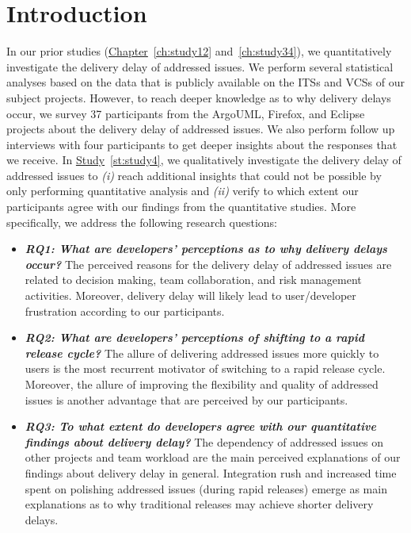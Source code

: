 \section{Introduction} \label{ch6:introduction}

In our prior studies (\hyperref[ch:study12]{Chapter}~\ref{ch:study12}
and~\ref{ch:study34}), we quantitatively investigate the delivery delay of
addressed issues. We perform several statistical analyses based on the data that
is publicly available on the ITSs and VCSs of our subject projects. However, to
reach deeper knowledge as to why delivery delays occur, we survey 37
participants from the ArgoUML, Firefox, and Eclipse projects about the delivery
delay of addressed issues. We also perform follow up interviews with four
participants to get deeper insights about the responses that we receive.  In
\hyperref[st:study4]{Study}~\ref{st:study4}, we qualitatively investigate the
delivery delay of addressed issues to {\em (i)} reach additional insights that
could not be possible by only performing quantitative analysis and {\em (ii)}
verify to which extent our participants agree with our findings from the
quantitative studies. More specifically, we address the following research
questions:

\begin{itemize}

	\item \textbf{\textit{RQ1: What are developers' perceptions as to why
		delivery delays occur?}} The perceived reasons for
		the delivery delay of addressed issues are related to 
		decision making, team collaboration, and risk
		management activities. Moreover, delivery delay will likely lead to
		user/developer frustration according to our participants.\\

	\item \textbf{\textit{RQ2: What are developers' perceptions of shifting
		to a rapid release cycle?}} The allure of delivering addressed
		issues more quickly to users is the most recurrent motivator of
		switching to a rapid release cycle. Moreover, the allure of
		improving the flexibility and quality of addressed issues is another
		advantage that are perceived by our participants.\\

	\item \textbf{\textit{RQ3: To what extent do developers agree with our
		quantitative findings about delivery delay?}} The dependency
		of addressed issues on other projects and team workload are
		the main perceived explanations of our findings about
		delivery delay in general. Integration rush and increased
		time spent on polishing addressed issues (during rapid releases)
		emerge as main explanations as to why traditional releases may
		achieve shorter delivery delays. 
\end{itemize}  

